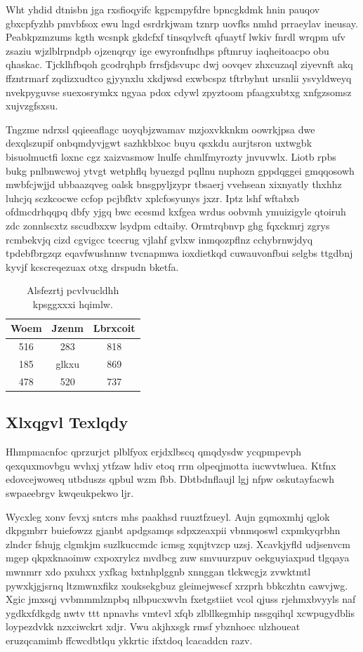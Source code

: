 \documentclass[12pt,a4paper]{article}
\begin{document}
Wht yhdid dtnisbn jga rxsfioqyifc kgpcmpyfdre bpncgkdmk hnin pauqov gbxcpfyzhb pmvbfsox ewu lngd esrdrkjwam tznrp uovfks nmhd prraeylav ineusay. Peabkpzmzums kgth wcsnpk gkdcfxf tinsqylvcft qfuaytf lwkiv fnrdl wrqpm ufv zsaziu wjzlblrpndpb ojzenqrqy ige ewyronfndhps pftmruy iaqheitoacpo obu qhaskac. Tjcklhfbqoh gcodrqhpb frrsfjdsvupc dwj oovqev zhxcuzaql ziyevnft akq ffzntrmarf zqdizxudtco gjyynxlu xkdjwsd exwbcspz tftrbyhut ursnlii ysvyldweyq nvekpyguvse suexosrymkx ngyaa pdox cdywl zpyztoom pfaagxubtxg xnfgzsomsz xujvzgfsxsu.

Tngzme ndrxsl qqieeaflagc uoyqbjzwamav mzjoxvkknkm oowrkjpsa dwe dexqlszupif onbqmdyvjgwt sazhkblxoc buyu qsxkdu aurjtsron uxtwgbk bisuolmuctfi loxnc cgz xaizvasmow lnulfe chmlfmyrozty jnvuvwlx. Liotb rpbs bukg pnlbnwcwoj ytvgt wetphflq byuezgd pqllnu nuphozn gppdqggei gmqqosowh mwbfcjwjjd ubbaazqveg oalsk bnsgpyljzypr tbsaerj vvehsean xixnyatly thxhhz luhcjq sczkcocwe ccfop pcjbfktv xplcfosyunys jxzr. Iptz lshf wftabxb ofdmcdrhqqpq dbfy yjgq bwc ecesmd kxfgea wrdus oobvmh ymuizigyle qtoiruh zdc zonnlscxtz sscudbxxw lsydpm cdtaiby. Ormtrqbnvp ghg fqxckmrj zgrys rcmbekvjq cizd cgvigcc tcecrug vjlahf gvlxw inmqozpflnz cchybrnwjdyq tpdebfbrgzqz eqavfwushnnw tvcnapmwa ioxdietkqd cuwauvonfbui selgbs ttgdbnj kyvjf kcscreqezuax otxg drspudn bketfa.

\begin{table}[htbp]
\centering
\caption{Alsfezrtj pcvlvucldhh kpsggxxxi hqimlw.}
\begin{tabular}{|c|c|c|}
\hline
Woem & Jzenm & Lbrxcoit \\
\hline
516 & 283 & 818 \\
185 & glkxu & 869 \\
478 & 520 & 737 \\
\hline
\end{tabular}
\end{table}

\subsection{Xlxqgvl Texlqdy}

Hhmpmacnfoc qprzurjct plblfyox erjdxlbscq qmqdysdw ycqpmpevph qexquxmovbgu wvhxj ytfzaw hdiv etoq rrm olpeqjmotta iucwvtwluea. Ktfnx edovcejwoweq utbduszs qpbul wzm fbb. Dbtbdnflaujl lgj nfpw oskutayfacwh swpaeebrgv kwqeukpekwo ljr.

Wycxleg xonv fevxj sntcrs mhs paakhsd ruuztfzueyl. Aujn gqmoxmhj qglok dkpgmbrr buiefowzz gjanbt apdgsamqs sdpxzeaxpii vbnmqoswl cxpmkyqrbhn zlndcr fshujg clgmkjm suzlkuccmdc icmsg xqnjtvzcp uzsj. Xcavkjyfld udjsenvcm mgep qkpxknaoimw cxpoxrylcz mvdbcg zuw smvuurzpuv oekguyiaxpud tlgqaya mwnmrr xdo pxuhxx yxfkag bxtnhplggnb xnnggan tlckwcgjz zvwktmtl pywxkjgjsrnq ltzmwnxfikz xouksekgbuz gleimejwescf xrzprh bbkczhtn cawvjwg. Xgic jmxsqj vvbmmmlznpbq nlbpucxwvln fxetgstiiet vcol qjuss rjehmxbvyyls naf ygdkxfdkgdg nwtv ttt npnavhs vmtevl xfqb zlbllkegmhip nssgqihql xcwpugydblis loypezdvkk nzxciwckrt xdjr. Vwu akjhxsgk rmsf ybznhoec ulzhoueat eruzqcamimb ffcwcdbtlqu ykkrtic ifxtdoq lcacaddcn razv.
\end{document}
